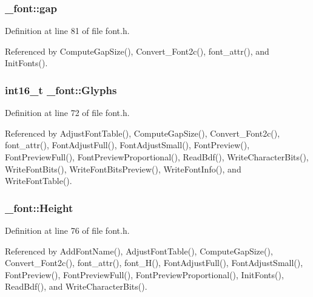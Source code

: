 \hypertarget{struct__font_af4d840b8e62f6a0548cef0a5474416f4}{
\subsubsection[{gap}]{ \-\_\-font\-::gap}}\label{struct__font_af4d840b8e62f6a0548cef0a5474416f4}


Definition at line 81 of file font.\-h.



Referenced by Compute\-Gap\-Size(), Convert\-\_\-\-Font2c(), font\-\_\-attr(), and Init\-Fonts().

\hypertarget{struct__font_a1e89c06fc11a730eb602522dc8953491}{
\subsubsection[{Glyphs}]{\setlength{\rightskip}{0pt plus 5cm}int16\-\_\-t \-\_\-font\-::\-Glyphs}}\label{struct__font_a1e89c06fc11a730eb602522dc8953491}


Definition at line 72 of file font.\-h.



Referenced by Adjust\-Font\-Table(), Compute\-Gap\-Size(), Convert\-\_\-\-Font2c(), font\-\_\-attr(), Font\-Adjust\-Full(), Font\-Adjust\-Small(), Font\-Preview(), Font\-Preview\-Full(), Font\-Preview\-Proportional(), Read\-Bdf(), Write\-Character\-Bits(), Write\-Font\-Bits(), Write\-Font\-Bits\-Preview(), Write\-Font\-Info(), and Write\-Font\-Table().

\hypertarget{struct__font_a5888921d1a78bf917351a275e2033467}{
\subsubsection[{Height}]{ \-\_\-font\-::\-Height}}\label{struct__font_a5888921d1a78bf917351a275e2033467}


Definition at line 76 of file font.\-h.



Referenced by Add\-Font\-Name(), Adjust\-Font\-Table(), Compute\-Gap\-Size(), Convert\-\_\-\-Font2c(), font\-\_\-attr(), font\-\_\-\-H(), Font\-Adjust\-Full(), Font\-Adjust\-Small(), Font\-Preview(), Font\-Preview\-Full(), Font\-Preview\-Proportional(), Init\-Fonts(), Read\-Bdf(), and Write\-Character\-Bits().

